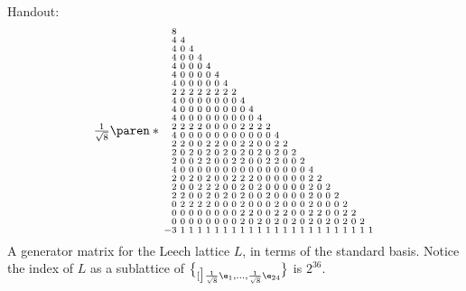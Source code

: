 Handout:
\[\catcode`?=\active\def?{\phantom{-}}
\tfrac{1}{\sqrt8}\paren*{\begin{smallmatrix}
?8 \\
?4 & 4 \\
?4 & 0 & 4 \\
?4 & 0 & 0 & 4 \\
?4 & 0 & 0 & 0 & 4 \\
?4 & 0 & 0 & 0 & 0 & 4 \\
?4 & 0 & 0 & 0 & 0 & 0 & 4 \\
?2 & 2 & 2 & 2 & 2 & 2 & 2 & 2 \\
?4 & 0 & 0 & 0 & 0 & 0 & 0 & 0 & 4 \\
?4 & 0 & 0 & 0 & 0 & 0 & 0 & 0 & 0 & 4 \\
?4 & 0 & 0 & 0 & 0 & 0 & 0 & 0 & 0 & 0 & 4 \\
?2 & 2 & 2 & 2 & 0 & 0 & 0 & 0 & 2 & 2 & 2 & 2 \\
?4 & 0 & 0 & 0 & 0 & 0 & 0 & 0 & 0 & 0 & 0 & 0 & 4 \\
?2 & 2 & 0 & 0 & 2 & 2 & 0 & 0 & 2 & 2 & 0 & 0 & 2 & 2 \\
?2 & 0 & 2 & 0 & 2 & 0 & 2 & 0 & 2 & 0 & 2 & 0 & 2 & 0 & 2 \\
?2 & 0 & 0 & 2 & 2 & 0 & 0 & 2 & 2 & 0 & 0 & 2 & 2 & 0 & 0 & 2 \\
?4 & 0 & 0 & 0 & 0 & 0 & 0 & 0 & 0 & 0 & 0 & 0 & 0 & 0 & 0 & 0 & 4 \\
?2 & 0 & 2 & 0 & 2 & 0 & 0 & 2 & 2 & 2 & 0 & 0 & 0 & 0 & 0 & 0 & 2 & 2 \\
?2 & 0 & 0 & 2 & 2 & 2 & 0 & 0 & 2 & 0 & 2 & 0 & 0 & 0 & 0 & 0 & 2 & 0 & 2 \\
?2 & 2 & 0 & 0 & 2 & 0 & 2 & 0 & 2 & 0 & 0 & 2 & 0 & 0 & 0 & 0 & 2 & 0 & 0 & 2 \\
?0 & 2 & 2 & 2 & 2 & 0 & 0 & 0 & 2 & 0 & 0 & 0 & 2 & 0 & 0 & 0 & 2 & 0 & 0 & 0 & 2 \\
?0 & 0 & 0 & 0 & 0 & 0 & 0 & 0 & 2 & 2 & 0 & 0 & 2 & 2 & 0 & 0 & 2 & 2 & 0 & 0 & 2 & 2 \\
?0 & 0 & 0 & 0 & 0 & 0 & 0 & 0 & 2 & 0 & 2 & 0 & 2 & 0 & 2 & 0 & 2 & 0 & 2 & 0 & 2 & 0 & 2 \\
-3& 1 & 1 & 1 & 1 & 1 & 1 & 1 & 1 & 1 & 1 & 1 & 1 & 1 & 1 & 1 & 1 & 1 & 1 & 1 & 1 & 1 & 1 & 1 
\end{smallmatrix}}
\]
A generator matrix for the Leech lattice $L$, in terms of the standard basis.  Notice the index of $L$ as a sublattice of $\brace[\big]{\frac{1}{\sqrt8}\e_1,\dotsc,\frac{1}{\sqrt8}\e_{24}}$ is $2^{36}$.

